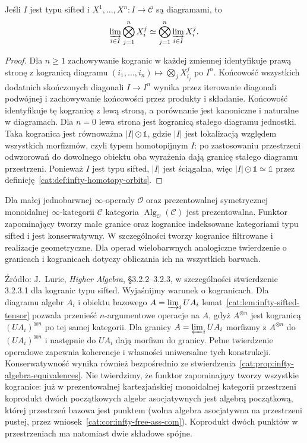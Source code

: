 \begin{lemat}\label{cat:lem:infty-sifted-tensor}
Jeśli $I$ jest typu sifted i $X^1,\ldots,X^n:I\to\mathcal C$ są diagramami, to
\[
 \varinjlim_{i\in I}\bigotimes_{j=1}^n X^j_i
 \simeq\bigotimes_{j=1}^n\varinjlim_{i\in I}X^j_i.
\]
\end{lemat}
\begin{proof}
Dla $n\geq1$ zachowywanie kogranic w każdej zmiennej identyfikuje prawą stronę z kogranicą diagramu $(i_1,\ldots,i_n)\mapsto\bigotimes_j X^j_{i_j}$ po $I^n$. Końcowość wszystkich dodatnich skończonych diagonali $I\to I^n$ wynika przez iterowanie diagonali podwójnej i zachowywanie końcowości przez produkty i składanie. Końcowość identyfikuje tę kogranicę z lewą stroną, a porównanie jest kanoniczne i naturalne w diagramach. Dla $n=0$ lewa strona jest kogranicą stałego diagramu jednostki. Taka kogranica jest równoważna $|I|\odot\mathbb 1$, gdzie $|I|$ jest lokalizacją względem wszystkich morfizmów, czyli typem homotopijnym $I$: po zastosowaniu przestrzeni odwzorowań do dowolnego obiektu oba wyrażenia dają granicę stałego diagramu przestrzeni. Ponieważ $I$ jest typu sifted, $|I|$ jest ściągalna, więc $|I|\odot\mathbb 1\simeq\mathbb 1$ przez definicję~\ref{cat:def:infty-homotopy-orbits}.
\end{proof}

\begin{twierdzenie}\label{cat:thm:infty-algebra-presentability}
Dla małej jednobarwnej $\infty$-operady $\mathcal O$ oraz prezentowalnej symetrycznej monoidalnej $\infty$-kategorii $\mathcal C$ kategoria $\operatorname{Alg}_{\mathcal O}(\mathcal C)$ jest prezentowalna. Funktor zapominający tworzy małe granice oraz kogranice indeksowane kategoriami typu sifted i jest konserwatywny. W szczególności tworzy kogranice filtrowane i realizacje geometryczne. Dla operad wielobarwnych analogiczne twierdzenie o granicach i kogranicach dotyczy obliczania ich na wszystkich barwach.
\end{twierdzenie}

Źródło: J.~Lurie, \emph{Higher Algebra}, \S3.2.2--3.2.3, w szczególności stwierdzenie 3.2.3.1 dla kogranic typu sifted. Wyjaśnijmy warunek o kogranicach. Dla diagramu algebr $A_i$ i obiektu bazowego $A=\varinjlim_i UA_i$ lemat~\ref{cat:lem:infty-sifted-tensor} pozwala przenieść $n$-argumentowe operacje na $A$, gdyż $A^{\otimes n}$ jest kogranicą $(UA_i)^{\otimes n}$ po tej samej kategorii. Dla granicy $A=\varprojlim_i UA_i$ morfizmy z $A^{\otimes n}$ do $(UA_i)^{\otimes n}$ i następnie do $UA_i$ dają morfizm do granicy. Pełne twierdzenie operadowe zapewnia koherencje i własności uniwersalne tych konstrukcji. Konserwatywność wynika również bezpośrednio ze stwierdzenia~\ref{cat:prop:infty-algebra-equivalences}. Nie twierdzimy, że funktor zapominający tworzy wszystkie kogranice: już w prezentowalnej kartezjańskiej monoidalnej kategorii przestrzeni koprodukt dwóch początkowych algebr asocjatywnych jest algebrą początkową, której przestrzeń bazowa jest punktem (wolna algebra asocjatywna na przestrzeni pustej, przez wniosek~\ref{cat:cor:infty-free-ass-com}). Koprodukt dwóch punktów w przestrzeniach ma natomiast dwie składowe spójne.

